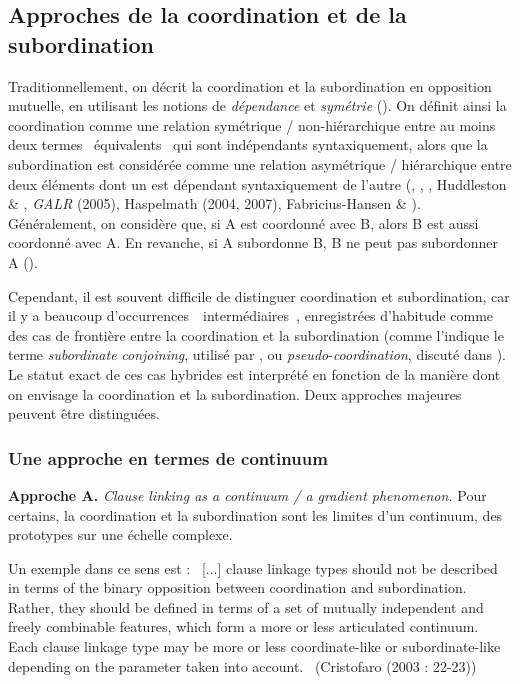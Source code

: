 \subsection{Approches de la coordination et de la subordination}
\label{bkm:Ref302033474}Traditionnellement, on décrit la coordination et la subordination en opposition mutuelle, en utilisant les notions de \textit{dépendance} et \textit{symétrie} (\citet{Haspelmath2007}). On définit ainsi la coordination comme une relation symétrique / non-hiérarchique entre au moins deux termes {\guillemotleft}~équivalents~{\guillemotright} qui sont indépendants syntaxiquement, alors que la subordination est considérée comme une relation asymétrique / hiérarchique entre deux éléments dont un est dépendant syntaxiquement de l'autre (\citet{Lang1984}, \citet{Lehmann1988}, \citet{Dik1997}, Huddleston \& \citet{Pullum2002}, \textit{GALR} (2005), Haspelmath (2004, 2007), Fabricius-Hansen \& \citet{Ramm2008}). Généralement, on considère que, si A est coordonné avec B, alors B est aussi coordonné avec A. En revanche, si A subordonne B, B ne peut pas subordonner A (\citet{Dik1997}).

Cependant, il est souvent difficile de distinguer coordination et subordination, car il y a beaucoup d'occurrences~{\guillemotleft}~intermédiaires~{\guillemotright}, enregistrées d'habitude comme des cas de frontière entre la coordination et la subordination (comme l'indique le terme \textit{subordinate} \textit{conjoining}, utilisé par \citet{Lang1984}, ou \textit{pseudo}-\textit{coordination}, discuté dans \citet{Johannessen1998}). Le statut exact de ces cas hybrides est interprété en fonction de la manière dont on envisage la coordination et la subordination. Deux approches majeures peuvent être distinguées.

\subsubsection{Une approche en termes de continuum}
\label{bkm:Ref300158658}\textbf{Approche A.} \textit{Clause linking as a continuum / a gradient phenomenon.} Pour certains, la coordination et la subordination sont les limites d'un continuum, des prototypes sur une échelle complexe. 

Un exemple dans ce sens est \citet{Cristofaro2003} : {\guillemotleft}~[...] clause linkage types should not be described in terms of the binary opposition between coordination and subordination. Rather, they should be defined in terms of a set of mutually independent and freely combinable features, which form a more or less articulated continuum. Each clause linkage type may be more or less coordinate-like or subordinate-like depending on the parameter taken into account.~{\guillemotright} (Cristofaro (2003 : 22-23))

